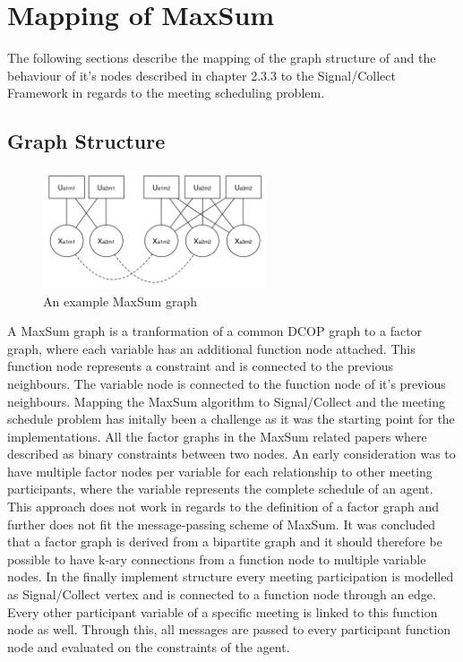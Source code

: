 \section{Mapping of MaxSum}

The following sections describe the mapping of the graph structure of  and the behaviour of it's nodes described in chapter 2.3.3 to the Signal/Collect Framework  in regards to the meeting scheduling problem. 

\subsection{Graph Structure}

\begin{figure}[H]
\includegraphics[width=250px]{graphics/maxsum_graph}
\centering
\caption{An example MaxSum graph}
\label{fig:maxsum_graph}
\end{figure}

A MaxSum graph is a tranformation of a common DCOP graph to a factor graph, where each variable has an additional function node attached. This function node represents a constraint and is connected to the previous neighbours. The variable node is connected to the function node of it's previous neighbours. Mapping the MaxSum algorithm to Signal/Collect and the meeting schedule problem has initally been a challenge as it was the starting point for the implementations. All the factor graphs in the MaxSum related papers where described as binary constraints between two nodes. An early consideration was to have multiple factor nodes per variable for each relationship to other meeting participants, where the variable represents the complete schedule of an agent.  This approach does not work in regards to the definition of a factor graph and further does not fit the message-passing scheme of MaxSum. It was concluded that a factor graph is derived from a bipartite graph and it should therefore be possible to have k-ary connections from a function node to multiple variable nodes. In the finally implement structure every meeting participation is modelled as Signal/Collect vertex and is connected to a function node through an edge. Every other participant variable of a specific meeting is linked to this function node as well. Through this, all messages are passed to every participant function node and evaluated on the constraints of the agent.

